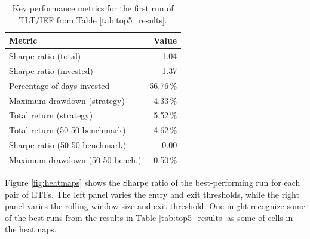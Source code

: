 \documentclass{article}
\begin{document}
\begin{table}[htbp]
\centering
\caption{Key performance metrics for the first run of TLT/IEF from Table \ref{tab:top5_results}.}
\label{tab:metrics_best}
\begin{tabular}{l r}
\toprule
\textbf{Metric} & \textbf{Value} \\
\midrule
Sharpe ratio (total)            & 1.04 \\
Sharpe ratio (invested)         & 1.37 \\
Percentage of days invested     & 56.76\,\% \\
Maximum drawdown (strategy)     & --4.33\,\% \\
Total return (strategy)         & 5.52\,\% \\
Total return (50-50 benchmark)  & --4.62\,\% \\
Sharpe ratio (50-50 benchmark)  & 0.00 \\
Maximum drawdown (50-50 bench.) & --0.50\,\% \\
\bottomrule
\end{tabular}
\end{table}

Figure \ref{fig:heatmaps} shows the Sharpe ratio of the best-performing run for each pair of ETFs. The left panel varies the entry and exit thresholds, while the right panel varies the rolling window size and exit threshold.
One might recognize some of the best runs from the results in Table \ref{tab:top5_results} as some of cells in the heatmaps.
\end{document}

